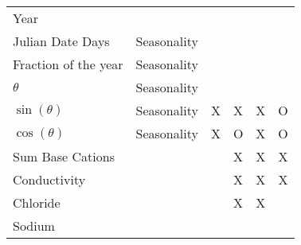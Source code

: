 \begin{table}[htbp]
\begin{tabular}{lccccc}
Year                               &                   &                                                      &                                                     &                                                                &  \\ 
Julian Date Days           &Seasonality &                                                      &                                                     &                                                                &  \\ 
Fraction of the year      &Seasonality &                                                     &                                                      &                                                                &  \\ 
$\theta$                        & Seasonality&                                                     &                                                      &                                                                &  \\ 
$\sin(\theta)$                &Seasonality & X                                                  & X                                                   & X                                                             & O \\ 
$\cos(\theta)$               &Seasonality & X                                                  & O                                                  & X                                                             & O \\ 
Sum Base Cations          &                   &                                                     & X                                                   & X                                                             & X \\ 
Conductivity                  &                   &                                                     & X                                                    & X                                                            & X \\ 
Chloride                         &                   &                                                     & X                                                    & X                                                            &  \\ 
Sodium                           &                   &                                                     &                                                      &                                                                &  \\ 

\end{tabular}
\end{table}
